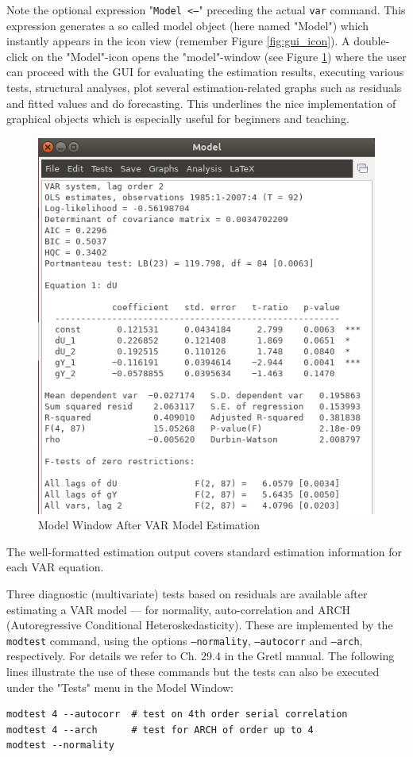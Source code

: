 \documentclass[11pt]{article}
\begin{document}
Note the optional expression "\texttt{Model <--}" preceding the actual \texttt{var} command. This expression generates a so called model object (here named "Model") which instantly appears in the icon view (remember Figure \ref{fig:gui_icon}). A double-click on the "Model"-icon opens the "model"-window (see Figure \ref{fig:gui_model}) where the user can proceed with the GUI for evaluating the estimation results, executing various tests, structural analyses, plot several estimation-related graphs such as residuals and fitted values and do forecasting. This underlines the nice implementation of graphical objects which is especially useful for beginners and teaching.

\begin{figure}[!h]
	\centering
	\includegraphics[width=.42\textwidth]{../figures/gui_var}
	\caption{Model Window After VAR Model Estimation}
	\label{fig:gui_model}
\end{figure}

The well-formatted estimation output covers standard estimation information for each VAR equation.

Three diagnostic (multivariate) tests based on residuals are available after estimating a VAR model --- for normality, auto-correlation and ARCH (Autoregressive Conditional Heteroskedasticity). These are implemented by the \texttt{modtest} command, using the options \texttt{---normality}, \texttt{---autocorr} and \texttt{---arch}, respectively. For details we refer to Ch. 29.4 in the Gretl manual. The following lines illustrate the use of these commands but the tests can also be executed under the "Tests" menu in the Model Window:
\begin{Verbatim}[baselinestretch=0.75, fontsize=\small]
modtest 4 --autocorr  # test on 4th order serial correlation
modtest 4 --arch      # test for ARCH of order up to 4
modtest --normality
\end{Verbatim}
\end{document}

